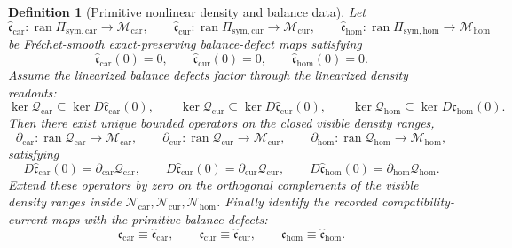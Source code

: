 \documentclass[11pt]{article}
\newcommand{\TensorSymProj}{\Pi_{\mathrm{sym,car}}}
\newcommand{\CurSymProj}{\Pi_{\mathrm{sym,cur}}}
\newcommand{\HomSymProj}{\Pi_{\mathrm{sym,hom}}}
\newcommand{\TensorCurrent}{\mathfrak c_{\mathrm{car}}}
\newcommand{\CurCurrent}{\mathfrak c_{\mathrm{cur}}}
\newcommand{\HomCurrent}{\mathfrak c_{\mathrm{hom}}}
\newcommand{\TensorDensityClass}{\mathscr N_{\mathrm{car}}}
\newcommand{\CurDensityClass}{\mathscr N_{\mathrm{cur}}}
\newcommand{\HomDensityClass}{\mathscr N_{\mathrm{hom}}}
\newcommand{\TensorDensity}{\mathcal Q_{\mathrm{car}}}
\newcommand{\CurDensity}{\mathcal Q_{\mathrm{cur}}}
\newcommand{\HomDensity}{\mathcal Q_{\mathrm{hom}}}
\newcommand{\TensorCont}{\partial_{\mathrm{car}}}
\newcommand{\CurCont}{\partial_{\mathrm{cur}}}
\newcommand{\HomCont}{\partial_{\mathrm{hom}}}
\newcommand{\TensorBalance}{\widehat{\mathfrak c}_{\mathrm{car}}}
\newcommand{\CurBalance}{\widehat{\mathfrak c}_{\mathrm{cur}}}
\newcommand{\HomBalance}{\widehat{\mathfrak c}_{\mathrm{hom}}}
\newtheorem{definition}{Definition}
\begin{document}
\begin{definition}[Primitive nonlinear density and balance data]
Let
\[
\TensorBalance:\operatorname{ran}\TensorSymProj\to\mathscr M_{\mathrm{car}},\qquad
\CurBalance:\operatorname{ran}\CurSymProj\to\mathscr M_{\mathrm{cur}},\qquad
\HomBalance:\operatorname{ran}\HomSymProj\to\mathscr M_{\mathrm{hom}}
\]
be Fr\'echet-smooth exact-preserving balance-defect maps satisfying
\begin{equation}
\TensorBalance(0)=0,\qquad
\CurBalance(0)=0,\qquad
\HomBalance(0)=0.
\label{eq:balance_zero}
\end{equation}
Assume the linearized balance defects factor through the linearized density readouts:
\begin{equation}
\ker\TensorDensity\subseteq\ker D\TensorBalance(0),\qquad
\ker\CurDensity\subseteq\ker D\CurBalance(0),\qquad
\ker\HomDensity\subseteq\ker D\HomBalance(0).
\label{eq:kernel_factor_condition}
\end{equation}
Then there exist unique bounded operators on the closed visible density ranges,
\begin{equation}
\TensorCont:\operatorname{ran}\TensorDensity\to\mathscr M_{\mathrm{car}},\qquad
\CurCont:\operatorname{ran}\CurDensity\to\mathscr M_{\mathrm{cur}},\qquad
\HomCont:\operatorname{ran}\HomDensity\to\mathscr M_{\mathrm{hom}},
\label{eq:continuity_on_range}
\end{equation}
satisfying
\begin{equation}
D\TensorBalance(0)=\TensorCont\TensorDensity,\qquad
D\CurBalance(0)=\CurCont\CurDensity,\qquad
D\HomBalance(0)=\HomCont\HomDensity.
\label{eq:balance_factorization}
\end{equation}
Extend these operators by zero on the orthogonal complements of the visible density ranges inside \(\TensorDensityClass,\CurDensityClass,\HomDensityClass\). Finally identify the recorded compatibility-current maps with the primitive balance defects:
\begin{equation}
\TensorCurrent\equiv\TensorBalance,\qquad
\CurCurrent\equiv\CurBalance,\qquad
\HomCurrent\equiv\HomBalance.
\label{eq:currents_as_balance}
\end{equation}
\end{definition}
\end{document}
